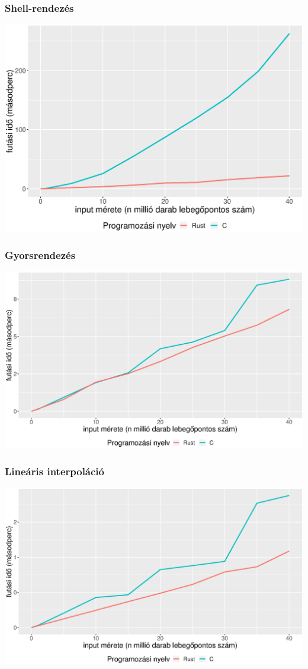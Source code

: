 \subsubsection{Shell-rendezés}
\includegraphics[width=15.5cm]{kepek/shells_sort_run_without_read.eps}

\subsubsection{Gyorsrendezés}
\includegraphics[width=15.5cm]{kepek/quicksort_run_without_read.eps}

\subsubsection{Lineáris interpoláció}
\includegraphics[width=15.5cm]{kepek/linear_interpolation_run_without_read.eps}


